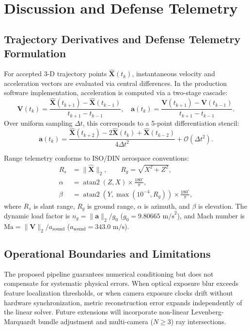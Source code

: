 \documentclass[a4paper,conference]{IEEEtran}
\newcommand{\X}{\mathbf{X}}
\begin{document}
\section{Discussion and Defense Telemetry}

\subsection{Trajectory Derivatives and Defense Telemetry Formulation}
For accepted 3-D trajectory points $\hat{\X}(t_k)$, instantaneous velocity and acceleration vectors are evaluated via central differences. In the production software implementation, acceleration is computed via a two-stage cascade:
\begin{equation}
\mathbf{V}(t_k) = \frac{\hat{\X}(t_{k+1}) - \hat{\X}(t_{k-1})}{t_{k+1} - t_{k-1}}, \quad
\mathbf{a}(t_k) = \frac{\mathbf{V}(t_{k+1}) - \mathbf{V}(t_{k-1})}{t_{k+1} - t_{k-1}}.
\label{eq:kin}
\end{equation}
Over uniform sampling $\Delta t$, this corresponds to a 5-point differentiation stencil:
\begin{equation}
\mathbf{a}(t_k) = \frac{\hat{\X}(t_{k+2}) - 2\hat{\X}(t_k) + \hat{\X}(t_{k-2})}{4 \Delta t^2} + \mathcal{O}(\Delta t^2).
\end{equation}

Range telemetry conforms to ISO/DIN aerospace conventions:
\begin{align}
R_s &= \|\hat{\X}\|_2, \qquad R_g = \sqrt{X^2 + Z^2}, \\
\alpha &= \operatorname{atan2}(Z, X) \times \frac{180^\circ}{\pi}, \\
\beta &= \operatorname{atan2}(Y, \max(10^{-4}, R_g)) \times \frac{180^\circ}{\pi},
\end{align}
where $R_s$ is slant range, $R_g$ is ground range, $\alpha$ is azimuth, and $\beta$ is elevation. The dynamic load factor is $n_g = \|\mathbf{a}\|_2 / g_0$ ($g_0 = 9.80665\text{ m/s}^2$), and Mach number is $\mathrm{Ma} = \|\mathbf{V}\|_2 / a_{\mathrm{sound}}$ ($a_{\mathrm{sound}} = 343.0\text{ m/s}$).

\subsection{Operational Boundaries and Limitations}
The proposed pipeline guarantees numerical conditioning but does not compensate for systematic physical errors. When optical exposure blur exceeds feature localization thresholds, or when camera exposure clocks drift without hardware synchronization, metric reconstruction error expands independently of the linear solver. Future extensions will incorporate non-linear Levenberg-Marquardt bundle adjustment and multi-camera ($N \ge 3$) ray intersections.
\end{document}
